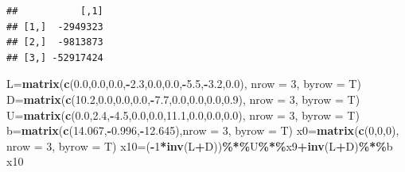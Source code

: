\documentclass[
]{article}
\newenvironment{Shaded}{\begin{snugshade}}{\end{snugshade}}
\newcommand{\AttributeTok}[1]{\textcolor[rgb]{0.13,0.29,0.53}{#1}}
\newcommand{\DecValTok}[1]{\textcolor[rgb]{0.00,0.00,0.81}{#1}}
\newcommand{\FloatTok}[1]{\textcolor[rgb]{0.00,0.00,0.81}{#1}}
\newcommand{\FunctionTok}[1]{\textcolor[rgb]{0.13,0.29,0.53}{\textbf{#1}}}
\newcommand{\NormalTok}[1]{#1}
\newcommand{\OtherTok}[1]{\textcolor[rgb]{0.56,0.35,0.01}{#1}}
\newcommand{\SpecialCharTok}[1]{\textcolor[rgb]{0.81,0.36,0.00}{\textbf{#1}}}
\begin{document}
\begin{verbatim}
##           [,1]
## [1,]  -2949323
## [2,]  -9813873
## [3,] -52917424
\end{verbatim}

\begin{Shaded}
\begin{Highlighting}[]
\NormalTok{  L}\OtherTok{=}\FunctionTok{matrix}\NormalTok{(}\FunctionTok{c}\NormalTok{(}\FloatTok{0.0}\NormalTok{,}\FloatTok{0.0}\NormalTok{,}\FloatTok{0.0}\NormalTok{,}\SpecialCharTok{{-}}\FloatTok{2.3}\NormalTok{,}\FloatTok{0.0}\NormalTok{,}\FloatTok{0.0}\NormalTok{,}\SpecialCharTok{{-}}\FloatTok{5.5}\NormalTok{,}\SpecialCharTok{{-}}\FloatTok{3.2}\NormalTok{,}\FloatTok{0.0}\NormalTok{), }\AttributeTok{nrow =} \DecValTok{3}\NormalTok{, }\AttributeTok{byrow =}\NormalTok{ T)}
\NormalTok{  D}\OtherTok{=}\FunctionTok{matrix}\NormalTok{(}\FunctionTok{c}\NormalTok{(}\FloatTok{10.2}\NormalTok{,}\FloatTok{0.0}\NormalTok{,}\FloatTok{0.0}\NormalTok{,}\FloatTok{0.0}\NormalTok{,}\SpecialCharTok{{-}}\FloatTok{7.7}\NormalTok{,}\FloatTok{0.0}\NormalTok{,}\FloatTok{0.0}\NormalTok{,}\FloatTok{0.0}\NormalTok{,}\FloatTok{0.9}\NormalTok{), }\AttributeTok{nrow =} \DecValTok{3}\NormalTok{, }\AttributeTok{byrow =}\NormalTok{ T)}
\NormalTok{  U}\OtherTok{=}\FunctionTok{matrix}\NormalTok{(}\FunctionTok{c}\NormalTok{(}\FloatTok{0.0}\NormalTok{,}\FloatTok{2.4}\NormalTok{,}\SpecialCharTok{{-}}\FloatTok{4.5}\NormalTok{,}\FloatTok{0.0}\NormalTok{,}\FloatTok{0.0}\NormalTok{,}\FloatTok{11.1}\NormalTok{,}\FloatTok{0.0}\NormalTok{,}\FloatTok{0.0}\NormalTok{,}\FloatTok{0.0}\NormalTok{), }\AttributeTok{nrow =} \DecValTok{3}\NormalTok{, }\AttributeTok{byrow =}\NormalTok{ T)}
\NormalTok{  b}\OtherTok{=}\FunctionTok{matrix}\NormalTok{(}\FunctionTok{c}\NormalTok{(}\FloatTok{14.067}\NormalTok{,}\SpecialCharTok{{-}}\FloatTok{0.996}\NormalTok{,}\SpecialCharTok{{-}}\FloatTok{12.645}\NormalTok{),}\AttributeTok{nrow =} \DecValTok{3}\NormalTok{, }\AttributeTok{byrow =}\NormalTok{ T)}
\NormalTok{  x0}\OtherTok{=}\FunctionTok{matrix}\NormalTok{(}\FunctionTok{c}\NormalTok{(}\DecValTok{0}\NormalTok{,}\DecValTok{0}\NormalTok{,}\DecValTok{0}\NormalTok{), }\AttributeTok{nrow =} \DecValTok{3}\NormalTok{, }\AttributeTok{byrow =}\NormalTok{ T)}
\NormalTok{  x10}\OtherTok{=}\NormalTok{(}\SpecialCharTok{{-}}\DecValTok{1}\SpecialCharTok{*}\FunctionTok{inv}\NormalTok{(L}\SpecialCharTok{+}\NormalTok{D))}\SpecialCharTok{\%*\%}\NormalTok{U}\SpecialCharTok{\%*\%}\NormalTok{x9}\SpecialCharTok{+}\FunctionTok{inv}\NormalTok{(L}\SpecialCharTok{+}\NormalTok{D)}\SpecialCharTok{\%*\%}\NormalTok{b}
\NormalTok{  x10}
\end{Highlighting}
\end{Shaded}
\end{document}
